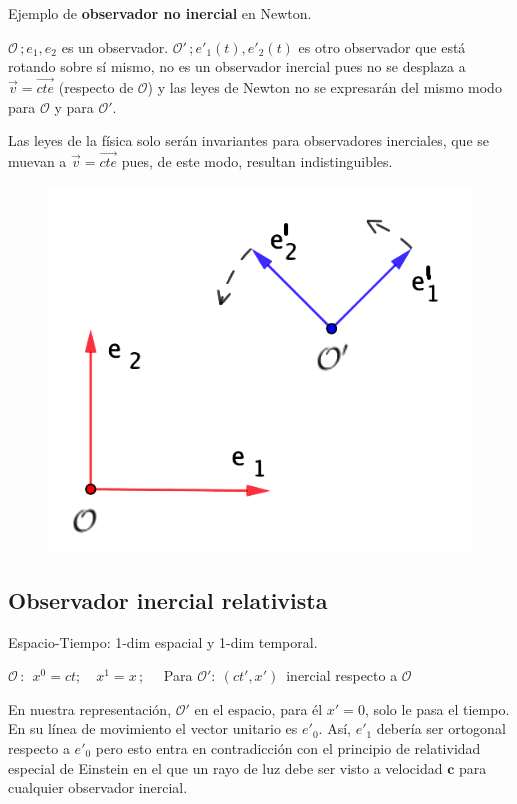 \begin{example}

Ejemplo de \textbf{observador no inercial} en Newton.	




\begin{multicols}{2}
$\mathcal O\, ; e_1,e_2$ es un observador. $\mathcal O'\, ; e'_1(t),e'_2(t)$ es otro observador que está rotando sobre sí mismo, no es un observador inercial pues no se desplaza a $\vec v = \overrightarrow {cte}$ (respecto de $\mathcal O$) y las leyes de Newton no se expresarán del mismo modo para $\mathcal O$ y para $\mathcal O'$.

\vspace{2mm}Las leyes de la física solo serán invariantes para observadores inerciales, que se muevan a $\vec v = \overrightarrow {cte}$ pues, de este modo, resultan indistinguibles. 
\begin{figure}[H]
	\centering
	\includegraphics[width=.4\textwidth]{imagenes/img30-05.png}
\end{figure}	

\end{multicols}


\end{example}




\subsection{Observador inercial relativista}
	
Espacio-Tiempo: 1-dim espacial y 1-dim temporal. 

$\mathcal O\,: \ \  x^0=ct;\quad x^1=x\, ; \quad $ Para $\mathcal O':\ (ct',x')\, $ inercial respecto a $\mathcal O$

En nuestra representación, $\mathcal O'$ en el espacio, para él $x'=0$, solo le pasa el tiempo. En su línea de movimiento el vector unitario es $e'_0$. Así, $e'_1$ debería ser ortogonal respecto a $e'_0$ pero esto entra en contradicción con el principio de relatividad especial de Einstein en el que un rayo de luz debe ser visto a velocidad $\boldsymbol c$ para cualquier observador inercial.


